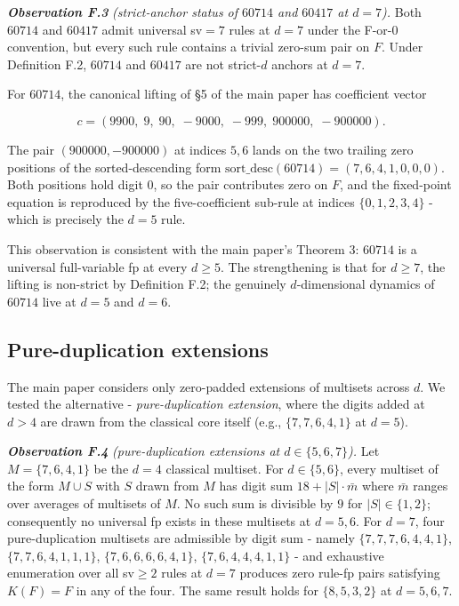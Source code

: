 \documentclass[11pt,letterpaper]{article}
\theoremstyle{paperstyle}
\theoremstyle{paperstyledef}
\theoremstyle{paperstylerem}
\begin{document}
\textbf{\emph{Observation F.3}} \emph{(strict-anchor status of \(60714\)
and \(60417\) at \(d = 7\)).} Both \(60714\) and \(60417\) admit
universal sv\(=7\) rules at \(d = 7\) under the F-or-0 convention, but
every such rule contains a trivial zero-sum pair on \(F\). Under
Definition F.2, \(60714\) and \(60417\) are not strict-\(d\) anchors at
\(d = 7\).

For \(60714\), the canonical lifting of §5 of the main paper has
coefficient vector

\[c = (9900,\; 9,\; 90,\; -9000,\; -999,\; 900000,\; -900000).\]

The pair \((900000, -900000)\) at indices \(5, 6\) lands on the two
trailing zero positions of the sorted-descending form
\(\mathrm{sort\_desc}(60714) = (7, 6, 4, 1, 0, 0, 0)\). Both positions
hold digit \(0\), so the pair contributes zero on \(F\), and the
fixed-point equation is reproduced by the five-coefficient sub-rule at
indices \(\{0, 1, 2, 3, 4\}\) - which is precisely the \(d = 5\) rule.

This observation is consistent with the main paper's Theorem 3:
\(60714\) is a universal full-variable fp at every \(d \geq 5\). The
strengthening is that for \(d \geq 7\), the lifting is non-strict by
Definition F.2; the genuinely \(d\)-dimensional dynamics of \(60714\)
live at \(d = 5\) and \(d = 6\).

\hypertarget{f.5-pure-duplication-extensions}{%
\subsection{Pure-duplication extensions}\label{f.5-pure-duplication-extensions}}

The main paper considers only zero-padded extensions of multisets across
\(d\). We tested the alternative - \emph{pure-duplication extension},
where the digits added at \(d > 4\) are drawn from the classical core
itself (e.g., \(\{7, 7, 6, 4, 1\}\) at \(d = 5\)).

\textbf{\emph{Observation F.4}} \emph{(pure-duplication extensions at
\(d \in \{5, 6, 7\}\)).} Let \(M = \{7, 6, 4, 1\}\) be the \(d = 4\)
classical multiset. For \(d \in \{5, 6\}\), every multiset of the form
\(M \cup S\) with \(S\) drawn from \(M\) has digit sum
\(18 + |S| \cdot \bar{m}\) where \(\bar{m}\) ranges over averages of
multisets of \(M\). No such sum is divisible by \(9\) for
\(|S| \in \{1, 2\}\); consequently no universal fp exists in these
multisets at \(d = 5, 6\). For \(d = 7\), four pure-duplication
multisets are admissible by digit sum - namely \(\{7,7,7,6,4,4,1\}\),
\(\{7,7,6,4,1,1,1\}\), \(\{7,6,6,6,6,4,1\}\), \(\{7,6,4,4,4,1,1\}\) -
and exhaustive enumeration over all sv\(\geq 2\) rules at \(d = 7\)
produces zero rule-fp pairs satisfying \(K(F) = F\) in any of the four.
The same result holds for \(\{8, 5, 3, 2\}\) at \(d = 5, 6, 7\).
\end{document}
